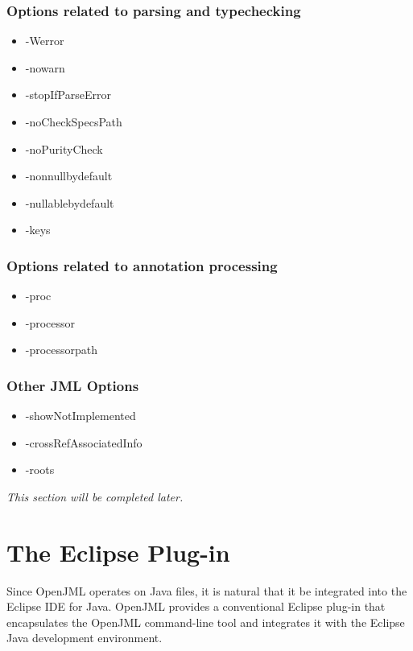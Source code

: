 \documentclass{report}%
\begin{document}
\subsection{Options related to parsing and typechecking}
\begin{itemize}
\item -Werror
\item -nowarn
\item -stopIfParseError
\item -noCheckSpecsPath
\item -noPurityCheck
\item -nonnullbydefault
\item -nullablebydefault
\item -keys
\end{itemize}

\subsection{Options related to annotation processing}
\begin{itemize}
\item -proc
\item -processor
\item -processorpath
\end{itemize}

\subsection{Other JML Options}
\begin{itemize}
\item -showNotImplemented
\item -crossRefAssociatedInfo
\item -roots
\end{itemize}


\textit{This section will be completed later.} %



\chapter{The Eclipse Plug-in}
\label{EclipsePlugin}

Since OpenJML operates on Java files, it is natural that it be integrated into the Eclipse IDE for Java.
OpenJML provides a conventional Eclipse plug-in that encapsulates the OpenJML command-line tool and integrates it
with the Eclipse Java development environment.
\end{document}
